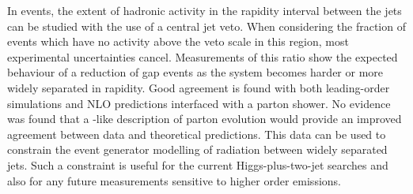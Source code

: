 In \dijet events, the extent of hadronic activity in the rapidity interval between
the jets can be studied with the use of a central jet veto. When considering the
fraction of events which have no activity above the veto scale in this region, most
experimental uncertainties cancel. Measurements of this ratio show the expected
behaviour of a reduction of gap events as the \dijet system becomes harder or more
widely separated in rapidity. Good agreement is found with both leading-order \MC
simulations and NLO predictions interfaced with a parton shower. No evidence was
found that a \BFKL-like description of parton evolution would provide an improved
agreement between data and theoretical predictions. This data can be used to constrain
the event generator modelling of \QCD radiation between widely separated jets. Such
a constraint is useful for the current Higgs-plus-two-jet searches and also for
any future measurements sensitive to higher order \QCD emissions.
